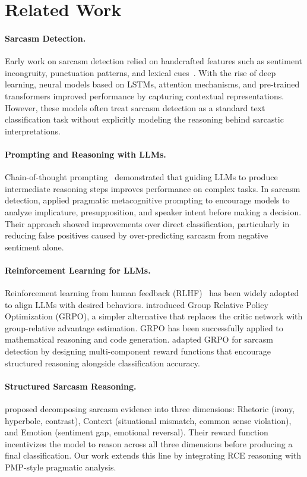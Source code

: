 \documentclass{article} %
\begin{document}
\section{Related Work}

\paragraph{Sarcasm Detection.}
Early work on sarcasm detection relied on handcrafted features such as sentiment incongruity, punctuation patterns, and lexical cues~\citep{joshi2017context}. With the rise of deep learning, neural models based on LSTMs, attention mechanisms, and pre-trained transformers improved performance by capturing contextual representations. However, these models often treat sarcasm detection as a standard text classification task without explicitly modeling the reasoning behind sarcastic interpretations.

\paragraph{Prompting and Reasoning with LLMs.}
Chain-of-thought prompting~\citep{wei2022chain} demonstrated that guiding LLMs to produce intermediate reasoning steps improves performance on complex tasks. In sarcasm detection, \citet{pmp} applied pragmatic metacognitive prompting to encourage models to analyze implicature, presupposition, and speaker intent before making a decision. Their approach showed improvements over direct classification, particularly in reducing false positives caused by over-predicting sarcasm from negative sentiment alone.

\paragraph{Reinforcement Learning for LLMs.}
Reinforcement learning from human feedback (RLHF)~\citep{ouyang2022training} has been widely adopted to align LLMs with desired behaviors. \citet{deepseekr1} introduced Group Relative Policy Optimization (GRPO), a simpler alternative that replaces the critic network with group-relative advantage estimation. GRPO has been successfully applied to mathematical reasoning and code generation. \citet{sarcasmr1} adapted GRPO for sarcasm detection by designing multi-component reward functions that encourage structured reasoning alongside classification accuracy.

\paragraph{Structured Sarcasm Reasoning.}
\citet{sarcasmr1} proposed decomposing sarcasm evidence into three dimensions: Rhetoric (irony, hyperbole, contrast), Context (situational mismatch, common sense violation), and Emotion (sentiment gap, emotional reversal). Their reward function incentivizes the model to reason across all three dimensions before producing a final classification. Our work extends this line by integrating RCE reasoning with PMP-style pragmatic analysis.
\end{document}
